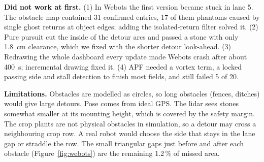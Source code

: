 \documentclass[12pt,a4paper]{article}
\begin{document}
\textbf{Did not work at first.} (1) In Webots the first version became stuck in lane 5. The obstacle map contained 31 confirmed entries, 17 of them phantoms caused by single ghost returns at object edges; adding the isolated-return filter solved it. (2) Pure pursuit cut the inside of the detour arcs and passed a stone with only 1.8~cm clearance, which we fixed with the shorter detour look-ahead. (3) Redrawing the whole dashboard every update made Webots crash after about 400~s; incremental drawing fixed it. (4) APF needed a vortex term, a locked passing side and stall detection to finish most fields, and still failed 5 of 20.

\textbf{Limitations.} Obstacles are modelled as circles, so long obstacles (fences, ditches) would give large detours. Pose comes from ideal GPS. The lidar sees stones somewhat smaller at its mounting height, which is covered by the safety margin. The crop plants are not physical obstacles in simulation, so a detour may cross a neighbouring crop row. A real robot would choose the side that stays in the lane gap or straddle the row. The small triangular gaps just before and after each obstacle (Figure~\ref{fig:webots}) are the remaining 1.2\,\% of missed area.
\end{document}
